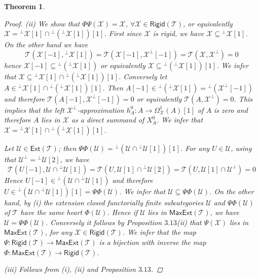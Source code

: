 \documentclass[oneside, a4paper,reqno]{amsart}
\numberwithin{equation}{section}
\newtheorem{thm}{Theorem}[section]
\theoremstyle{definition}
\begin{document}
\begin{thm}
\begin{proof}
(ii) We show that $\Phi\Psi({\mathcal X}) = {\mathcal X}$, $\forall {\mathcal X} \in \mathsf{Rigid}({\mathcal T})$, or equivalently ${\mathcal X} = {^{\bot}}{\mathcal X}[1] \cap {^{\bot}}({^{\bot}}{\mathcal X}[1])[1]$. First since ${\mathcal X}$ is rigid, we have ${\mathcal X} \subseteq {^{\bot}}{\mathcal X}[1]$. On the other hand we have 
\[
{\mathcal T}({\mathcal X}[-1], {^{\bot}}{\mathcal X}[1]) = {\mathcal T}({\mathcal X}[-1],{\mathcal X}^{\bot}[-1]) = {\mathcal T}({\mathcal X},{\mathcal X}^{\bot}) = 0
\]
 hence ${\mathcal X}[-1] \subseteq  {^{\bot}}({^{\bot}}{\mathcal X}[1])$ or equivalently ${\mathcal X} \subseteq {^{\bot}}({^{\bot}}{\mathcal X}[1])[1]$. We infer that ${\mathcal X} \subseteq {^{\bot}}{\mathcal X}[1] \cap {^{\bot}}({^{\bot}}{\mathcal X}[1])[1]$. Conversely let $A\in {^{\bot}}{\mathcal X}[1] \cap {^{\bot}}({^{\bot}}{\mathcal X}[1])[1]$. Then $A[-1] \in {^{\bot}}({^{\bot}}{\mathcal X}[1]) = {^{\bot}}({\mathcal X}^{\bot}[-1])$ and therefore ${\mathcal T}(A[-1],{\mathcal X}^{\bot}[-1]) = 0$ or equivalently ${\mathcal T}(A,{\mathcal X}^{\bot}) = 0$. This implies that the left ${\mathcal X}^{\bot}$-approximation $h^{0}_{A} \colon A {\longrightarrow} \Omega^{1}_{\mathcal X}(A)[1]$ of $A$ is zero and therefore $A$ lies in ${\mathcal X}$ as a direct summand of $X^{0}_{A}$. We infer that ${\mathcal X} = {^{\bot}}{\mathcal X}[1] \cap {^{\bot}}({^{\bot}}{\mathcal X}[1])[1]$.

 Let ${\mathcal U} \in \mathsf{Ext}({\mathcal T})$; then $\Psi\Phi({\mathcal U}) = {^{\bot}}({\mathcal U}\cap {^{\bot}}{\mathcal U}[1])[1]$. For any $U \in {\mathcal U}$,  using that ${\mathcal U}^{\bot} = {^{\bot}}{\mathcal U}[2]$, we have 
 \[
 {\mathcal T}(U[-1], {\mathcal U}\cap {^{\bot}}{\mathcal U}[1]) = {\mathcal T}(U,{\mathcal U}[1]\cap  {^{\bot}}{\mathcal U}[2]) = {\mathcal T}(U,{\mathcal U}[1]\cap {\mathcal U}^{\bot}) = 0
 \]
  Hence $U[-1] \in {^{\bot}}( {\mathcal U}\cap {^{\bot}}{\mathcal U}[1])$ and therefore $U \in  {^{\bot}}({\mathcal U}\cap {^{\bot}}{\mathcal U}[1])[1] = \Psi\Phi({\mathcal U})$. We infer that ${\mathcal U} \subseteq \Psi\Phi({\mathcal U})$. On the other hand,   
 by (i) the extension closed functorially finite subcategories ${\mathcal U}$ and $\Psi\Phi({\mathcal U})$ of ${\mathcal T}$ have the same heart $\Phi({\mathcal U})$. Hence if ${\mathcal U}$ lies in $\mathsf{MaxExt}({\mathcal T})$, we have ${\mathcal U} = \Psi\Phi({\mathcal U})$. Conversely it follows by Proposition $3.13$(ii) that $\Psi({\mathcal X})$ lies in $\mathsf{MaxExt}({\mathcal T})$, for any ${\mathcal X} \in \mathsf{Rigid}({\mathcal T})$. We infer that the map $\Psi \colon \mathsf{Rigid}({\mathcal T}) {\longrightarrow} \mathsf{MaxExt}({\mathcal T})$ is a bijection with inverse the map $\Phi \colon \mathsf{MaxExt}({\mathcal T}) {\longrightarrow} \mathsf{Rigid}({\mathcal T})$.   
 
 (iii) Follows from (i), (ii) and Proposition $3.13$. 
\end{proof}
\end{thm} 
\end{document}
